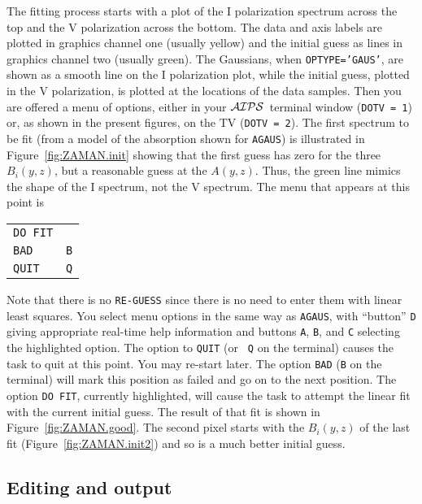 \documentclass[twoside]{article}
\newcommand{\AIPS}{{$\cal AIPS\/$}}
\begin{document}
The fitting process starts with a plot of the I polarization spectrum
across the top and the V polarization across the bottom.  The data
and axis labels are plotted in graphics channel one (usually yellow)
and the initial guess as lines in graphics channel two (usually
green).  The Gaussians, when {\tt OPTYPE='GAUS'}, are shown as a
smooth line on the I polarization plot, while the initial guess,
plotted in the V polarization, is plotted at the locations of the data
samples.  Then you are offered a menu of options, either in your
\AIPS\ terminal window ({\tt DOTV = 1}) or, as shown in the present
figures, on the TV ({\tt DOTV = 2}).  The first spectrum to be fit
(from a model of the absorption shown for {\tt AGAUS}) is illustrated
in Figure~\ref{fig:ZAMAN.init} showing that the first guess has zero
for the three $B_i(y,z)$, but a reasonable guess at the $A(y,z)$.
Thus, the green line mimics the shape of the I spectrum, not the V
spectrum.  The menu that appears at this point is\\
\begin{center}
\begin{tabular}{|l|l|}\hline
   {\tt DO FIT}   & {\tt \hphantom{A}} \\
   {\tt BAD}      & {\tt B} \\
   {\tt QUIT}     & {\tt Q} \\ \hline
\end{tabular}
\end{center}
Note that there is no {\tt RE-GUESS} since there is no need to enter
them with linear least squares.  You select menu options in the same
way as {\tt AGAUS}, with ``button'' {\tt D} giving appropriate
real-time help information and buttons {\tt A}, {\tt B}, and {\tt C}
selecting the highlighted option.  The option to {\tt QUIT} (or {\tt
  Q} on the terminal) causes the task to quit at this point.  You may
re-start later.  The option {\tt BAD} ({\tt B} on the terminal) will
mark this position as failed and go on to the next position.  The
option {\tt DO FIT}, currently highlighted, will cause the task to
attempt the linear fit with the current initial guess.  The result of
that fit is shown in Figure~\ref{fig:ZAMAN.good}.  The second pixel
starts with the $B_i(y,z)$ of the last fit
(Figure~\ref{fig:ZAMAN.init2}) and so is a much better initial guess.

\subsection{Editing and output}
\end{document}
